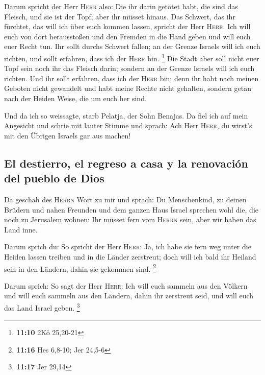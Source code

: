  Darum spricht der Herr \textsc{Herr} also: Die ihr darin
getötet habt, die sind das Fleisch, und sie ist der Topf; aber ihr
müsset hinaus.  Das Schwert, das ihr fürchtet, das will
ich über euch kommen lassen, spricht der Herr \textsc{Herr}.
 Ich will euch von dort herausstoßen und den Fremden in
die Hand geben und will euch euer Recht tun.  Ihr sollt
durchs Schwert fallen; an der Grenze Israels will ich euch richten, und
sollt erfahren, dass ich der \textsc{Herr} bin. \footnote{\textbf{11:10}
  2Kö 25,20-21}  Die Stadt aber soll nicht euer Topf sein
noch ihr das Fleisch darin; sondern an der Grenze Israels will ich euch
richten.  Und ihr sollt erfahren, dass ich der
\textsc{Herr} bin; denn ihr habt nach meinen Geboten nicht gewandelt und
habt meine Rechte nicht gehalten, sondern getan nach der Heiden Weise,
die um euch her sind.

 Und da ich so weissagte, starb Pelatja, der Sohn
Benajas. Da fiel ich auf mein Angesicht und schrie mit lauter Stimme und
sprach: Ach Herr \textsc{Herr}, du wirst's mit den Übrigen Israels gar
aus machen!

\hypertarget{el-destierro-el-regreso-a-casa-y-la-renovaciuxf3n-del-pueblo-de-dios}{%
\subsection{El destierro, el regreso a casa y la renovación del pueblo
de
Dios}\label{el-destierro-el-regreso-a-casa-y-la-renovaciuxf3n-del-pueblo-de-dios}}

 Da geschah des \textsc{Herrn} Wort zu mir und sprach:
 Du Menschenkind, zu deinen Brüdern und nahen Freunden
und dem ganzen Haus Israel sprechen wohl die, die noch zu Jerusalem
wohnen: Ihr müsset fern vom \textsc{Herrn} sein, aber wir haben das Land
inne.

 Darum sprich du: So spricht der Herr \textsc{Herr}: Ja,
ich habe sie fern weg unter die Heiden lassen treiben und in die Länder
zerstreut; doch will ich bald ihr Heiland sein in den Ländern, dahin sie
gekommen sind. \footnote{\textbf{11:16} Hes 6,8-10; Jer 24,5-6}

 Darum sprich: So sagt der Herr \textsc{Herr}: Ich will
euch sammeln aus den Völkern und will euch sammeln aus den Ländern,
dahin ihr zerstreut seid, und will euch das Land Israel geben.
\footnote{\textbf{11:17} Jer 29,14}

